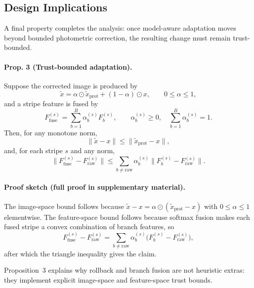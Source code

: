\documentclass[sigconf,screen,review,anonymous]{acmart}
\begin{document}
\subsection{Design Implications}

A final property completes the analysis: once model-aware adaptation moves
beyond bounded photometric correction, the resulting change must remain
trust-bounded.

\paragraph{Prop. 3 (Trust-bounded adaptation).}
Suppose the corrected image is produced by
\[
  \tilde{x}
  =
  \alpha \odot \tilde{x}_{\mathrm{prot}} + (1-\alpha)\odot x,
  \qquad
  0 \le \alpha \le 1,
\]
and a stripe feature is fused by
\[
  F_{\mathrm{fuse}}^{(s)} = \sum_{b=1}^{B}\alpha_b^{(s)}F_b^{(s)},
  \qquad
  \alpha_b^{(s)} \ge 0,\quad \sum_{b=1}^{B}\alpha_b^{(s)}=1.
\]
Then, for any monotone norm,
\[
  \|\tilde{x}-x\|
  \le
  \|\tilde{x}_{\mathrm{prot}}-x\|,
\]
and, for each stripe $s$ and any norm,
\[
  \|F_{\mathrm{fuse}}^{(s)} - F_{\mathrm{raw}}^{(s)}\|
  \le
  \sum_{b \neq \mathrm{raw}}
  \alpha_b^{(s)}
  \|F_b^{(s)} - F_{\mathrm{raw}}^{(s)}\|.
\]

\paragraph{Proof sketch (full proof in supplementary material).}
The image-space bound follows because
$\tilde{x}-x=\alpha\odot(\tilde{x}_{\mathrm{prot}}-x)$ with
$0 \le \alpha \le 1$ elementwise.
The feature-space bound follows because softmax fusion makes each fused stripe a
convex combination of branch features, so
\[
  F_{\mathrm{fuse}}^{(s)} - F_{\mathrm{raw}}^{(s)}
  =
  \sum_{b \neq \mathrm{raw}}
  \alpha_b^{(s)}\bigl(F_b^{(s)} - F_{\mathrm{raw}}^{(s)}\bigr),
\]
 after which the triangle inequality gives the claim.

Proposition~3 explains why rollback and branch fusion are not heuristic extras:
they implement explicit image-space and feature-space trust bounds.
\end{document}
